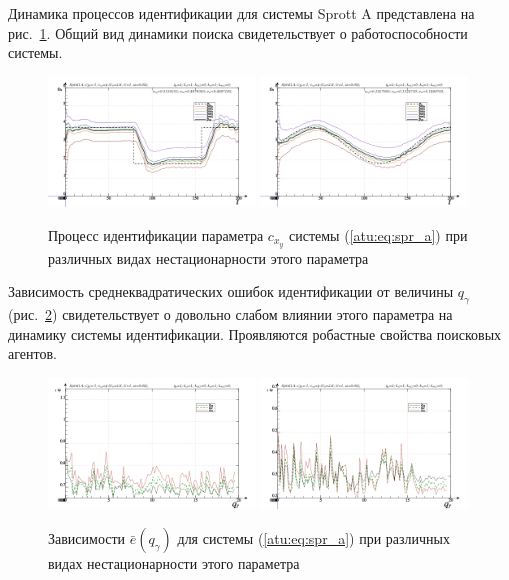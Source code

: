 Динамика процессов идентификации для системы Sprott A представлена на рис.~\ref{atu:f:spr_a_id}.
Общий вид динамики поиска свидетельствует о работоспособности системы.

\begin{figure}[htb!]
\centerline{
  \includegraphics[width=0.49\textwidth]{p/cha/spr_a/sprott_a_m5p-pl_n_sign.png}
  \includegraphics[width=0.49\textwidth]{p/cha/spr_a/sprott_a_m5p-pl_n_sin.png}
}
\caption{Процесс идентификации параметра $c_{x_y} $ системы (\ref{atu:eq:spr_a})
  при различных видах нестационарности этого параметра
}
\label{atu:f:spr_a_id}
\end{figure}

Зависимость среднеквадратических ошибок идентификации от величины $q_\gamma$ (рис.~\ref{atu:f:spr_a_e_qgamma})
свидетельствует о довольно слабом влиянии этого параметра
на динамику системы идентификации.
Проявляются робастные свойства поисковых агентов.

\begin{figure}[htb!]
\centerline{
  \includegraphics[width=0.49\textwidth]{p/cha/spr_a/sprott_a_m5p-p_qg_e_sign.png}
  \includegraphics[width=0.49\textwidth]{p/cha/spr_a/sprott_a_m5p-p_qg_e_sin.png}
}
  \caption{Зависимости  $\bar{e}(q_\gamma)$ для системы (\ref{atu:eq:spr_a})
  при различных видах нестационарности этого параметра
}
\label{atu:f:spr_a_e_qgamma}
\end{figure}


